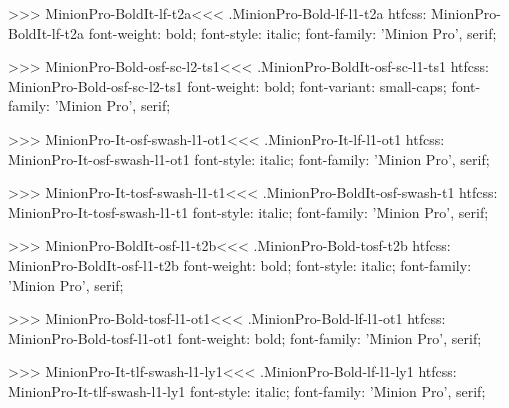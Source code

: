{>>>
\<MinionPro-BoldIt-lf-t2a\><<<
.MinionPro-Bold-lf-l1-t2a
htfcss:  MinionPro-BoldIt-lf-t2a  font-weight: bold; font-style: italic; font-family: 'Minion Pro', serif;

>>>
\<MinionPro-Bold-osf-sc-l2-ts1\><<<
.MinionPro-BoldIt-osf-sc-l1-ts1
htfcss:  MinionPro-Bold-osf-sc-l2-ts1  font-weight: bold; font-variant: small-caps; font-family: 'Minion Pro', serif;

>>>
\<MinionPro-It-osf-swash-l1-ot1\><<<
.MinionPro-It-lf-l1-ot1
htfcss:  MinionPro-It-osf-swash-l1-ot1  font-style: italic; font-family: 'Minion Pro', serif;

>>>
\<MinionPro-It-tosf-swash-l1-t1\><<<
.MinionPro-BoldIt-osf-swash-t1
htfcss:  MinionPro-It-tosf-swash-l1-t1  font-style: italic; font-family: 'Minion Pro', serif;

>>>
\<MinionPro-BoldIt-osf-l1-t2b\><<<
.MinionPro-Bold-tosf-t2b
htfcss:  MinionPro-BoldIt-osf-l1-t2b  font-weight: bold; font-style: italic; font-family: 'Minion Pro', serif;

>>>
\<MinionPro-Bold-tosf-l1-ot1\><<<
.MinionPro-Bold-lf-l1-ot1
htfcss:  MinionPro-Bold-tosf-l1-ot1  font-weight: bold; font-family: 'Minion Pro', serif;

>>>
\<MinionPro-It-tlf-swash-l1-ly1\><<<
.MinionPro-Bold-lf-l1-ly1
htfcss:  MinionPro-It-tlf-swash-l1-ly1  font-style: italic; font-family: 'Minion Pro', serif;

}
